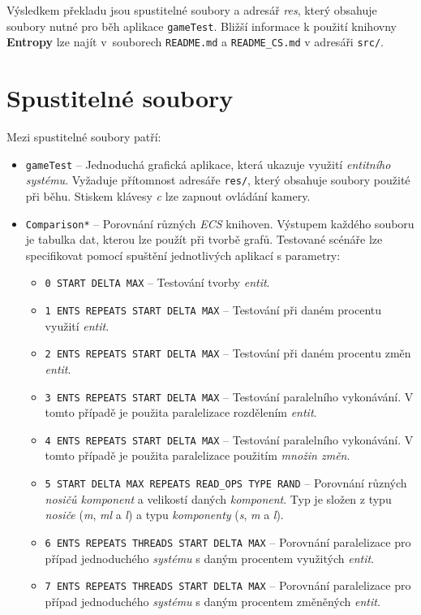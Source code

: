 Výsledkem překladu jsou spustitelné soubory a adresář \emph{res}, který obsahuje soubory nutné pro běh aplikace \texttt{gameTest}. Bližší informace k použití knihovny \textbf{Entropy} lze najít v~souborech \texttt{README.md} a \texttt{README\_CS.md} v adresáři \texttt{src/}.

\section*{Spustitelné soubory}

Mezi spustitelné soubory patří:
\begin{itemize}
	\item \texttt{gameTest} -- Jednoduchá grafická aplikace, která ukazuje využití \emph{entitního systému}. Vyžaduje přítomnost adresáře \texttt{res/}, který obsahuje soubory použité při běhu. Stiskem klávesy \emph{c} lze zapnout ovládání kamery.
	\item \texttt{Comparison*} -- Porovnání různých \emph{ECS} knihoven. Výstupem každého souboru je tabulka dat, kterou lze použít při tvorbě grafů. Testované scénáře lze specifikovat pomocí spuštění jednotlivých aplikací s parametry:
	\begin{itemize}
		\item \texttt{0 START DELTA MAX} -- Testování tvorby \emph{entit}.
		\item \texttt{1 ENTS REPEATS START DELTA MAX} -- Testování při daném procentu využití \emph{entit}.
		\item \texttt{2 ENTS REPEATS START DELTA MAX} -- Testování při daném procentu změn \emph{entit}.
		\item \texttt{3 ENTS REPEATS START DELTA MAX} -- Testování paralelního vykonávání. V tomto případě je použita paralelizace rozdělením \emph{entit}.
		\item \texttt{4 ENTS REPEATS START DELTA MAX} -- Testování paralelního vykonávání. V tomto případě je použita paralelizace použitím \emph{množin změn}.
		\item \texttt{5 START DELTA MAX REPEATS READ\_OPS TYPE RAND} -- Porovnání různých \emph{nosičů komponent} a velikostí daných \emph{komponent}. Typ je složen z typu \emph{nosiče} (\emph{m}, \emph{ml} a \emph{l}) a typu \emph{komponenty} (\emph{s}, \emph{m} a \emph{l}).
		\item \texttt{6 ENTS REPEATS THREADS START DELTA MAX} -- Porovnání paralelizace pro případ jednoduchého \emph{systému} s daným procentem využitých \emph{entit}.
		\item \texttt{7 ENTS REPEATS THREADS START DELTA MAX} -- Porovnání paralelizace pro případ jednoduchého \emph{systému} s daným procentem změněných \emph{entit}.

\end{itemize}
\end{itemize}
